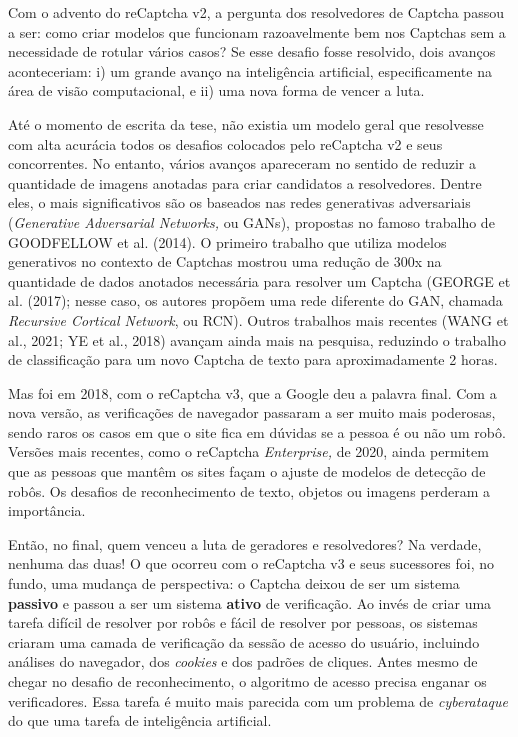 \documentclass[12pt,twoside,brazilian]{book}
\begin{document}
Com o advento do reCaptcha v2, a pergunta dos resolvedores de Captcha
passou a ser: como criar modelos que funcionam razoavelmente bem nos
Captchas sem a necessidade de rotular vários casos? Se esse desafio
fosse resolvido, dois avanços aconteceriam: i) um grande avanço na
inteligência artificial, especificamente na área de visão computacional,
e ii) uma nova forma de vencer a luta.

Até o momento de escrita da tese, não existia um modelo geral que
resolvesse com alta acurácia todos os desafios colocados pelo reCaptcha
v2 e seus concorrentes. No entanto, vários avanços apareceram no sentido
de reduzir a quantidade de imagens anotadas para criar candidatos a
resolvedores. Dentre eles, o mais significativos são os baseados nas
redes generativas adversariais (\emph{Generative Adversarial Networks,}
ou GANs), propostas no famoso trabalho de GOODFELLOW et al. (2014). O
primeiro trabalho que utiliza modelos generativos no contexto de
Captchas mostrou uma redução de 300x na quantidade de dados anotados
necessária para resolver um Captcha (GEORGE et al. (2017); nesse caso,
os autores propõem uma rede diferente do GAN, chamada \emph{Recursive
Cortical Network}, ou RCN). Outros trabalhos mais recentes (WANG et al.,
2021; YE et al., 2018) avançam ainda mais na pesquisa, reduzindo o
trabalho de classificação para um novo Captcha de texto para
aproximadamente 2 horas.

Mas foi em 2018, com o reCaptcha v3, que a Google deu a palavra final.
Com a nova versão, as verificações de navegador passaram a ser muito
mais poderosas, sendo raros os casos em que o site fica em dúvidas se a
pessoa é ou não um robô. Versões mais recentes, como o reCaptcha
\emph{Enterprise,} de 2020, ainda permitem que as pessoas que mantêm os
sites façam o ajuste de modelos de detecção de robôs. Os desafios de
reconhecimento de texto, objetos ou imagens perderam a importância.

Então, no final, quem venceu a luta de geradores e resolvedores? Na
verdade, nenhuma das duas! O que ocorreu com o reCaptcha v3 e seus
sucessores foi, no fundo, uma mudança de perspectiva: o Captcha deixou
de ser um sistema \textbf{passivo} e passou a ser um sistema
\textbf{ativo} de verificação. Ao invés de criar uma tarefa difícil de
resolver por robôs e fácil de resolver por pessoas, os sistemas criaram
uma camada de verificação da sessão de acesso do usuário, incluindo
análises do navegador, dos \emph{cookies} e dos padrões de cliques.
Antes mesmo de chegar no desafio de reconhecimento, o algoritmo de
acesso precisa enganar os verificadores. Essa tarefa é muito mais
parecida com um problema de \emph{cyberataque} do que uma tarefa de
inteligência artificial.
\end{document}
